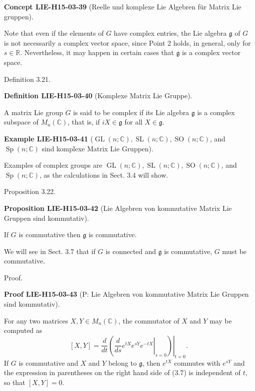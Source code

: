 \documentclass[10pt, letterpaper]{article}
\newcommand{\CustomHeading}[3]{%
  \par\medskip\noindent%
  \textbf{#1 #2} \textnormal{(#3)}.\enskip%
}
\newenvironment{DEF}[2]{\begin{unitbox}\CustomHeading{Definition}{#1}{#2}}{\end{unitbox}}
\newenvironment{PROP}[2]{\begin{unitbox}\CustomHeading{Proposition}{#1}{#2}}{\end{unitbox}}
\newenvironment{EXA}[2]{\begin{unitbox}\CustomHeading{Example}{#1}{#2}}{\end{unitbox}}
\newenvironment{CONC}[2]{\begin{unitbox}\CustomHeading{Concept}{#1}{#2}}{\end{unitbox}}
\newenvironment{PROOF}[2]{\begin{unitbox}\CustomHeading{Proof}{#1}{#2}}{\end{unitbox}}
\begin{document}
\begin{CONC}{LIE-H15-03-39}{Reelle und komplexe Lie Algebren für Matrix Lie gruppen}
Note that even if the elements of $G$ have complex entries, the Lie algebra $\mathfrak{g}$ of $G$ is not necessarily a complex vector space, since Point 2 holds, in general, only for $s \in \mathbb{R}$. Nevertheless, it may happen in certain cases that $\mathfrak{g}$ is a complex vector space.
\end{CONC}

Definition 3.21. 

\begin{DEF}{LIE-H15-03-40}{Komplexe Matrix Lie Gruppe}
A matrix Lie group $G$ is said to be complex if its Lie algebra $\mathfrak{g}$ is a complex subspace of $M_{n}(\mathbb{C})$, that is, if $i X \in \mathfrak{g}$ for all $X \in \mathfrak{g}$.
\end{DEF}


\begin{EXA}{LIE-H15-03-41}{$\operatorname{GL}(n ; \mathbb{C}), \operatorname{SL}(n ; \mathbb{C}), \operatorname{SO}(n ; \mathbb{C})$, and $\operatorname{Sp}(n ; \mathbb{C})$ sind komplexe Matrix Lie Gruppen}
Examples of complex groups are $\operatorname{GL}(n ; \mathbb{C}), \operatorname{SL}(n ; \mathbb{C}), \operatorname{SO}(n ; \mathbb{C})$, and $\operatorname{Sp}(n ; \mathbb{C})$, as the calculations in Sect. 3.4 will show.
\end{EXA}

Proposition 3.22. 

\begin{PROP}{LIE-H15-03-42}{Lie Algebren von kommutative Matrix Lie Gruppen sind kommutativ}
If $G$ is commutative then $\mathfrak{g}$ is commutative.
\end{PROP}


We will see in Sect. 3.7 that if $G$ is connected and $\mathfrak{g}$ is commutative, $G$ must be commutative.

Proof. 

\begin{PROOF}{LIE-H15-03-43}{P: Lie Algebren von kommutative Matrix Lie Gruppen sind kommutativ}
For any two matrices $X, Y \in M_{n}(\mathbb{C})$, the commutator of $X$ and $Y$ may be computed as
$$
[X, Y]=\left.\frac{d}{d t}\left(\left.\frac{d}{d s} e^{t X} e^{s Y} e^{-t X}\right|_{s=0}\right)\right|_{t=0} .
$$
If $G$ is commutative and $X$ and $Y$ belong to $\mathfrak{g}$, then $e^{t X}$ commutes with $e^{s Y}$ and the expression in parentheses on the right hand side of (3.7) is independent of $t$, so that $[X, Y]=0$.
\end{PROOF}
\end{document}
